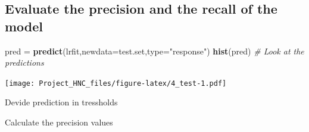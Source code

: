 \documentclass[]{article}
\newenvironment{Shaded}{\begin{snugshade}}{\end{snugshade}}
\newcommand{\KeywordTok}[1]{\textcolor[rgb]{0.13,0.29,0.53}{\textbf{#1}}}
\newcommand{\DataTypeTok}[1]{\textcolor[rgb]{0.13,0.29,0.53}{#1}}
\newcommand{\FloatTok}[1]{\textcolor[rgb]{0.00,0.00,0.81}{#1}}
\newcommand{\StringTok}[1]{\textcolor[rgb]{0.31,0.60,0.02}{#1}}
\newcommand{\CommentTok}[1]{\textcolor[rgb]{0.56,0.35,0.01}{\textit{#1}}}
\newcommand{\ControlFlowTok}[1]{\textcolor[rgb]{0.13,0.29,0.53}{\textbf{#1}}}
\newcommand{\OperatorTok}[1]{\textcolor[rgb]{0.81,0.36,0.00}{\textbf{#1}}}
\newcommand{\NormalTok}[1]{#1}
\begin{document}
\subsection{Evaluate the precision and the recall of the
model}\label{evaluate-the-precision-and-the-recall-of-the-model}

\begin{Shaded}
\begin{Highlighting}[]
\NormalTok{pred =}\StringTok{ }\KeywordTok{predict}\NormalTok{(lrfit,}\DataTypeTok{newdata=}\NormalTok{test.set,}\DataTypeTok{type=}\StringTok{"response"}\NormalTok{)}
\KeywordTok{hist}\NormalTok{(pred) }\CommentTok{# Look at the predictions}
\end{Highlighting}
\end{Shaded}

\texttt{[image: Project\_HNC\_files/figure-latex/4\_test-1.pdf]}

Devide prediction in tressholds

\begin{Shaded}
\end{Shaded}

Calculate the precision values
\end{document}
